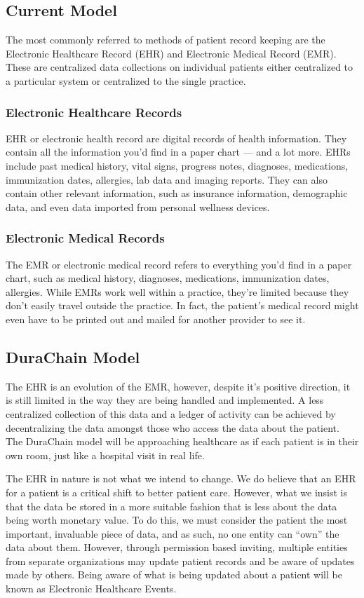 \documentclass[12pt]{article}
\begin{document}
  \subsection{Current Model}
  The most commonly referred to methods of patient record keeping are the Electronic Healthcare Record (EHR) and Electronic Medical Record (EMR). These are centralized data collections on individual patients either centralized to a particular system or centralized to the single practice.

    \subsubsection{Electronic Healthcare Records}
    EHR or electronic health record are digital records of health information. They contain all the information you’d find in a paper chart — and a lot more. EHRs include past medical history, vital signs, progress notes, diagnoses, medications, immunization dates, allergies, lab data and imaging reports. They can also contain other relevant information, such as insurance information, demographic data, and even data imported from personal wellness devices.

    \subsubsection{Electronic Medical Records}
    The EMR or electronic medical record refers to everything you’d find in a paper chart, such as medical history, diagnoses, medications, immunization dates, allergies. While EMRs work well within a practice, they’re limited because they don’t easily travel outside the practice. In fact, the patient’s medical record might even have to be printed out and mailed for another provider to see it.

  \subsection{DuraChain Model}
  The EHR is an evolution of the EMR, however, despite it’s positive direction, it is still limited in the way they are being handled and implemented. A less centralized collection of this data and a ledger of activity can be achieved by decentralizing the data amongst those who access the data about the patient. The DuraChain model will be approaching healthcare as if each patient is in their own room, just like a hospital visit in real life.  

  The EHR in nature is not what we intend to change. We do believe that an EHR for a patient is a critical shift to better patient care. However, what we insist is that the data be stored in a more suitable fashion that is less about the data being worth monetary value. To do this, we must consider the patient the most important, invaluable piece of data, and as such, no one entity can “own” the data about them. However, through permission based inviting, multiple entities from separate organizations may update patient records and be aware of updates made by others. Being aware of what is being updated about a patient will be known as Electronic Healthcare Events.
\end{document}

